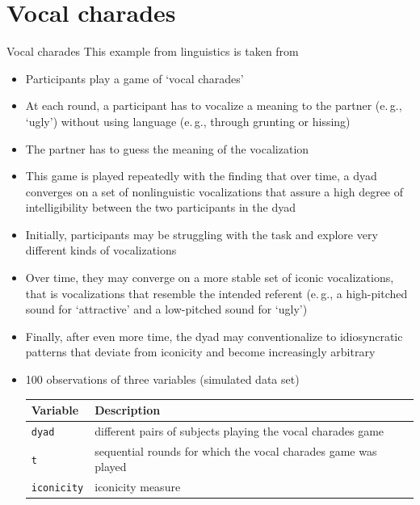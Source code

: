 \documentclass[aspectratio=169]{beamer}
\begin{document}
\section{Vocal charades}

\begin{frame}{Vocal charades}
This example from linguistics is taken from \citet{Winter2016}\\[2ex]
\begin{itemize}
  \item Participants play a game of `vocal charades'
  \item At each round, a participant has to vocalize a meaning to the
  partner (e.\,g., `ugly') without using language (e.\,g., through grunting or
  hissing)
  \item The partner has to guess the meaning of the vocalization
  \item This game is played repeatedly with the finding that over time, a
  dyad converges on a set of nonlinguistic vocalizations that assure a high
  degree of intelligibility between the two participants in the dyad
  \item Initially, participants may be struggling with the task and explore
  very different kinds of vocalizations
  \item Over time, they may converge on a more stable set of iconic
  vocalizations, that is vocalizations that resemble the intended referent
  (e.\,g., a high-pitched sound for `attractive' and a low-pitched sound for
  `ugly')
  \item Finally, after even more time, the dyad may conventionalize to
  idiosyncratic patterns that deviate from iconicity and become
  increasingly arbitrary
    \item 100 observations of three variables (simulated data set)\\[2ex]
  \begin{tabular}{lp{10cm}}
      Variable & Description \\
    \hline
      \texttt{dyad} & different pairs of subjects playing the vocal charades game\\
      \texttt{t} & sequential rounds for which the vocal charades game was played \\
      \texttt{iconicity} & iconicity measure \\
     \hline
  \end{tabular}
  \end{itemize}
\end{frame}
\end{document}
